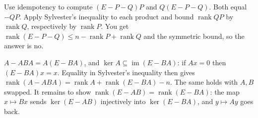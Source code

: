 \documentclass[11pt,a4paper]{article}
\begin{document}
Use idempotency to compute \((E-P-Q)P\) and \(Q(E-P-Q)\). Both equal \(-QP\).
Apply Sylvester's inequality to each product and bound \(\operatorname{rank}QP\) by \(\operatorname{rank}Q\), respectively by \(\operatorname{rank}P\). You get \(\operatorname{rank}(E-P-Q)\le n-\operatorname{rank}P+\operatorname{rank}Q\) and the symmetric bound, so the answer is no.

\(A-ABA=A(E-BA)\), and \(\ker A\subseteq\operatorname{im}(E-BA)\): if \(Ax=0\) then \((E-BA)x=x\). Equality in Sylvester's inequality then gives \(\operatorname{rank}(A-ABA)=\operatorname{rank}A+\operatorname{rank}(E-BA)-n\).
The same holds with \(A,B\) swapped. It remains to show \(\operatorname{rank}(E-AB)=\operatorname{rank}(E-BA)\): the map \(x\mapsto Bx\) sends \(\ker(E-AB)\) injectively into \(\ker(E-BA)\), and \(y\mapsto Ay\) goes back.
\end{document}
